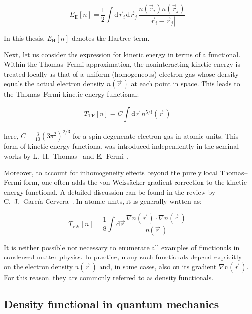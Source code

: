 \begin{equation}
    E_\mathrm{H}[n]=\frac{1}{2}\int\mathrm{d}\vec{r}_i\,\mathrm{d}\vec{r}_j\,\frac{n(\vec{r}_i)n(\vec{r}_j)}{|\vec{r}_i-\vec{r}_j|}
\label{hartree_functional}
\end{equation}

In this thesis, $E_\mathrm{H}[n]$ denotes the Hartree term.

Next, let us consider the expression for kinetic energy in terms of a functional. Within the Thomas--Fermi approximation,
the noninteracting kinetic energy is treated locally as that of a uniform (homogeneous) electron gas whose density equals the actual electron density $n(\vec{r}\,)$ at each point in space.
This leads to the Thomas--Fermi kinetic energy functional:

\begin{equation}
    T_\mathrm{TF}[n]=C\int\mathrm{d}\vec{r}\,n^{5/3}(\vec{r}\,)
\label{tf_functional}
\end{equation}

here, $C=\frac{3}{10}(3\pi^2)^{2/3}$ for a spin-degenerate electron gas in atomic units.
This form of kinetic energy functional was introduced independently in the seminal works by L.~H.~Thomas~\cite{thomas1927calculation} and E.~Fermi~\cite{fermi1927metodo}.

Moreover, to account for inhomogeneity effects beyond the purely local Thomas--Fermi form, one often adds the von Weizsäcker gradient correction to the kinetic energy functional.
A detailed discussion can be found in the review by C.~J.~García-Cervera~\cite{garcia2007efficient}.
In atomic units, it is generally written as:

\begin{equation}
    T_\mathrm{vW}[n] = \frac{1}{8}\int \mathrm{d}\vec{r}\,\frac{\nabla n(\vec{r}\,)\cdot\nabla n(\vec{r}\,)}{n(\vec{r}\,)}
\label{vw_functional}
\end{equation}

It is neither possible nor necessary to enumerate all examples of functionals in condensed matter physics.
In practice, many such functionals depend explicitly on the electron density $n(\vec{r}\,)$ and, in some cases, also on its gradient $\nabla n(\vec{r}\,)$.
For this reason, they are commonly referred to as density functionals.

\subsection{Density functional in quantum mechanics}

